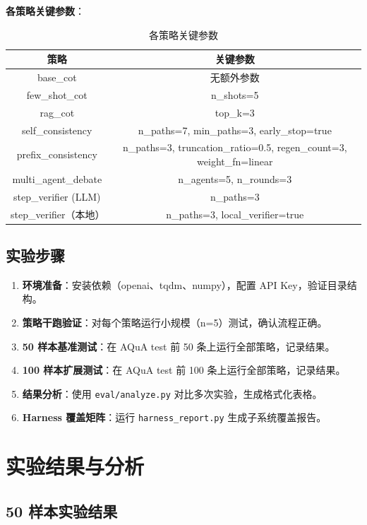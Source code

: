 \documentclass[lang=cn,a4paper,newtx]{elegantpaper}
\begin{document}
\textbf{各策略关键参数}：

\begin{table}[htbp]
\centering
\caption{各策略关键参数}
\begin{tabular}{cc}
\toprule
策略 & 关键参数 \\
\midrule
base\_cot & 无额外参数 \\
few\_shot\_cot & n\_shots=5 \\
rag\_cot & top\_k=3 \\
self\_consistency & n\_paths=7, min\_paths=3, early\_stop=true \\
prefix\_consistency & n\_paths=3, truncation\_ratio=0.5, regen\_count=3, weight\_fn=linear \\
multi\_agent\_debate & n\_agents=5, n\_rounds=3 \\
step\_verifier (LLM) & n\_paths=3 \\
step\_verifier（本地） & n\_paths=3, local\_verifier=true \\
\bottomrule
\end{tabular}
\end{table}

\subsection{实验步骤}

\begin{enumerate}
  \item \textbf{环境准备}：安装依赖（openai、tqdm、numpy），配置 API Key，验证目录结构。
  \item \textbf{策略干跑验证}：对每个策略运行小规模（n=5）测试，确认流程正确。
  \item \textbf{50 样本基准测试}：在 AQuA test 前 50 条上运行全部策略，记录结果。
  \item \textbf{100 样本扩展测试}：在 AQuA test 前 100 条上运行全部策略，记录结果。
  \item \textbf{结果分析}：使用 \texttt{eval/analyze.py} 对比多次实验，生成格式化表格。
  \item \textbf{Harness 覆盖矩阵}：运行 \texttt{harness\_report.py} 生成子系统覆盖报告。
\end{enumerate}

\section{实验结果与分析}

\subsection{50 样本实验结果}
\end{document}
